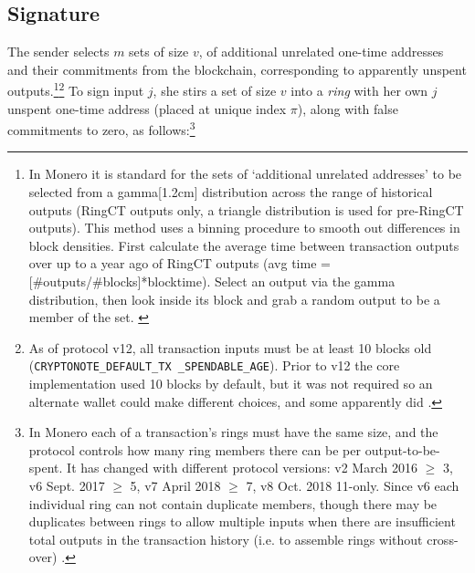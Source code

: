 \subsection{Signature}
\label{full-signature}

The sender selects $m$ sets of size $v$, of additional unrelated one-time addresses and their commitments from the blockchain, corresponding to apparently unspent outputs.\footnote{\label{input-selection}In Monero it is standard for the sets of `additional unrelated addresses' to be selected from a gamma[1.2cm] distribution across the range of historical outputs (RingCT outputs only, a triangle distribution is used for pre-RingCT outputs). This method uses a binning procedure to smooth out differences in block densities. First calculate the average time between transaction outputs over up to a year ago of RingCT outputs (avg time = [\#outputs/\#blocks]*blocktime). Select an output via the gamma distribution, then look inside its block and grab a random output to be a member of the set. \cite{AnalysisOfLinkability}}\footnote{As of protocol v12, all transaction inputs must be at least 10 blocks old ({\tt CRYPTONOTE\_DEFAULT\_TX \_SPENDABLE\_AGE}). Prior to v12 the core implementation used 10 blocks by default, but it was not required so an alternate wallet could make different choices, and some apparently did \cite{visualizing-monero-vid}.} To sign input $j$, she stirs a set of size $v$ into a {\em ring} with her own $j$\nth unspent one-time address (placed at unique index $\pi$), along with false commitments to zero, as follows:\footnote{In Monero each of a transaction's rings must have the same size, and the protocol controls how many ring members there can be per output-to-be-spent. It has changed with different protocol versions: v2 March 2016 $\geq$ 3, v6 Sept. 2017 $\geq$ 5, v7 April 2018 $\geq$ 7, v8 Oct. 2018 11-only. Since v6 each individual ring can not contain duplicate members, though there may be duplicates between rings to allow multiple inputs when there are insufficient total outputs in the transaction history (i.e. to assemble rings without cross-over) \cite{duplicate-ring-members}.}

